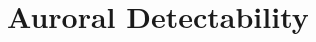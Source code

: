 \documentclass[apjl]{emulateapj}
\begin{document}
 
\section{Auroral Detectability}
\label{sec:detect}
\end{document}
